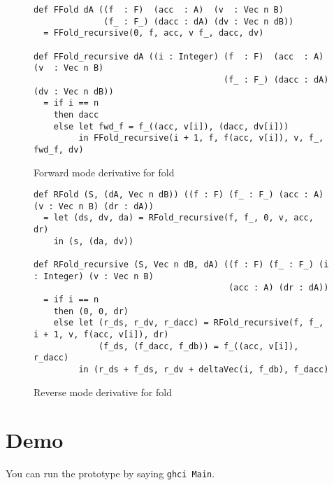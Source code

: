 \documentclass[sigplan,review]{acmart}
\begin{document}
\begin{figure*}
\begin{verbatim}
def FFold dA ((f  : F)  (acc  : A)  (v  : Vec n B)
              (f_ : F_) (dacc : dA) (dv : Vec n dB))
  = FFold_recursive(0, f, acc, v f_, dacc, dv)

def FFold_recursive dA ((i : Integer) (f  : F)  (acc  : A)  (v  : Vec n B)
                                      (f_ : F_) (dacc : dA) (dv : Vec n dB))
  = if i == n
    then dacc
    else let fwd_f = f_((acc, v[i]), (dacc, dv[i]))
         in FFold_recursive(i + 1, f, f(acc, v[i]), v, f_, fwd_f, dv)
\end{verbatim}
\caption{Forward mode derivative for fold}
\end{figure*}

\begin{figure*}
\begin{verbatim}
def RFold (S, (dA, Vec n dB)) ((f : F) (f_ : F_) (acc : A) (v : Vec n B) (dr : dA))
  = let (ds, dv, da) = RFold_recursive(f, f_, 0, v, acc, dr)
    in (s, (da, dv))

def RFold_recursive (S, Vec n dB, dA) ((f : F) (f_ : F_) (i : Integer) (v : Vec n B)
                                       (acc : A) (dr : dA))
  = if i == n
    then (0, 0, dr)
    else let (r_ds, r_dv, r_dacc) = RFold_recursive(f, f_, i + 1, v, f(acc, v[i]), dr)
             (f_ds, (f_dacc, f_db)) = f_((acc, v[i]), r_dacc)
         in (r_ds + f_ds, r_dv + deltaVec(i, f_db), f_dacc)
\end{verbatim}
\caption{Reverse mode derivative for fold}
\end{figure*}
\section{Demo}

You can run the prototype by saying {\tt ghci Main}.
\end{document}
